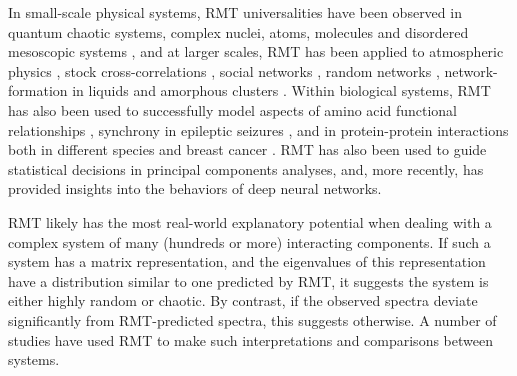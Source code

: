 \documentclass[12pt]{spieman}  %
\begin{document}
\begin{spacing}{2}
In small-scale physical systems, RMT universalities have been observed in
quantum chaotic systems, complex nuclei, atoms, molecules and disordered
mesoscopic systems
\cite{guhrRandommatrixTheoriesQuantum1998a,mehtaRandomMatrices2004,brodyRandommatrixPhysicsSpectrum1981,beenakkerRandommatrixTheoryQuantum1997,bohigasHigherOrderCorrelationsSpectra1985,wintgenLevelStatisticsQuantized1988,pandeySkewOrthogonalPolynomialsUniversality2001},
and at larger scales, RMT has been applied to atmospheric physics
\cite{santhanamStatisticsAtmosphericCorrelations2001}, stock cross-correlations
\cite{plerouRandomMatrixApproach2002} , social networks
\cite{jalanUncoveringRandomnessSuccess2014}, random networks
\cite{bandyopadhyayUniversalityComplexNetworks2007}, network-formation in
liquids
\cite{sastrySpectralStatisticsInstantaneous2001,matharooSpectralStatisticsQuenched2009}
and amorphous clusters
\cite{sarkarUniversalityVibrationalSpectra2004,matharooVibrationalSpectraAmorphous2005,matharooUniversalityVibrationalSpectra2008}.
Within biological systems, RMT has also been used to successfully model aspects
of  amino acid functional relationships
\cite{bhadolaTargetingFunctionalMotifs2016}, synchrony in epileptic seizures
\cite{osorioPhasesynchronizationRandommatrixBased2011}, and in protein-protein
interactions both in different species
\cite{agrawalQuantifyingRandomnessProtein2014} and breast cancer
\cite{raiRandomnessPreservedPatterns2015}. RMT has also been used to guide
statistical decisions in principal components
analyses\cite{franklinParallelAnalysisMethod1995,
veraartDenoisingDiffusionMRI2016, ulfarssonDimensionEstimationNoisy2008}, and,
more recently, has provided insights into the behaviors of deep
neural networks\cite{martinImplicitSelfRegularizationDeep2021,
martinPredictingTrendsQuality2021}.

RMT likely has the most real-world explanatory potential when dealing with a
complex system of many (hundreds or more\cite{mehtaRandomMatrices2004})
interacting components. If such a system has a matrix representation, and the
eigenvalues of this representation have a distribution similar to one predicted
by RMT, it suggests the system is either highly random or chaotic. By contrast,
if the observed spectra deviate significantly from RMT-predicted spectra, this
suggests otherwise. A number of studies have used RMT to make such
interpretations and comparisons between
systems\cite{santhanamStatisticsAtmosphericCorrelations2001,
jalanUncoveringRandomnessSuccess2014,
bandyopadhyayUniversalityComplexNetworks2007,
agrawalQuantifyingRandomnessProtein2014, raiRandomnessPreservedPatterns2015,
sebaRandomMatrixAnalysis2003, wangSpectralPropertiesTemporal2015,
wangRandomMatrixTheory2016, matharooSpontaneousBackpainAlters2020}.


\end{spacing}
\end{document}
